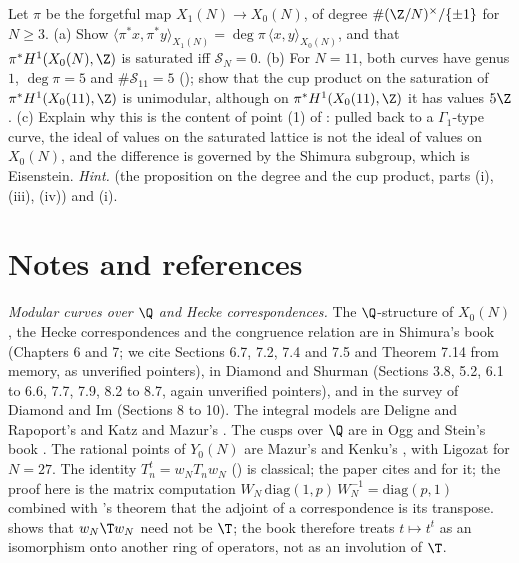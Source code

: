 \begin{exercise}[harder]\label{ex:moddeg:ex-shimura}
Let $\pi$ be the forgetful map $X_1(N)\to X_0(N)$, of degree $\#(\Z/N)^\times/\{\pm1\}$ for $N\ge3$. (a) Show $\langle\pi^*x,\pi^*y\rangle_{X_1(N)}=\deg\pi\,\langle x,y\rangle_{X_0(N)}$, and that
$\pi^*H^1(X_0(N),\Z)$ is saturated iff $\mathcal S_N=0$. (b) For $N=11$, both curves have genus $1$, $\deg\pi=5$ and $\#\mathcal S_{11}=5$ (); show that the cup product on the
saturation of $\pi^*H^1(X_0(11),\Z)$ is unimodular, although on $\pi^*H^1(X_0(11),\Z)$ it has values $5\Z$. (c) Explain why this is the content of point (1) of : pulled back to a
$\Gamma_1$-type curve, the ideal of values on the saturated lattice is not the ideal of values on $X_0(N)$, and the difference is governed by the Shimura subgroup, which is Eisenstein.
\emph{Hint.}  (the proposition on the degree and the cup product, parts (i), (iii), (iv)) and (i).
\end{exercise}

\section{Notes and references}\label{sec:moddeg:notes}

\emph{Modular curves over $\Q$ and Hecke correspondences.} The $\Q$-structure of $X_0(N)$, the Hecke correspondences and the congruence relation are in Shimura's book \cite{Shimura71} (Chapters 6
and 7; we cite Sections 6.7, 7.2, 7.4 and 7.5 and Theorem 7.14 from memory, as unverified pointers), in Diamond and Shurman \cite{DiamondShurman} (Sections 3.8, 5.2, 6.1 to 6.6, 7.7, 7.9, 8.2 to 8.7, again
unverified pointers), and in the survey of Diamond and Im \cite{DiamondIm} (Sections 8 to 10). The integral models are Deligne and Rapoport's \cite{DeligneRapoport73} and Katz and Mazur's \cite{KatzMazur85}. The
cusps over $\Q$ are in Ogg \cite{Ogg73} and Stein's book \cite{Stein}. The rational points of $Y_0(N)$ are Mazur's \cite{Mazur78} and Kenku's \cite{Kenku79,Kenku80a,Kenku80b,Kenku81}, with Ligozat
\cite{Ligozat75} for $N=27$. The identity $T_n^t=w_NT_nw_N$ () is classical; the paper cites \cite[\S\S1.6.1, 1.8.2]{DFG04} and \cite[\S4.4]{DDT} for it; the proof here is
the matrix computation $W_N\,\mathrm{diag}(1,p)\,W_N^{-1}=\mathrm{diag}(p,1)$ combined with 's theorem that the adjoint of a correspondence is its transpose.  shows that
$w_N\T w_N$ need not be $\T$; the book therefore treats $t\mapsto t^t$ as an isomorphism onto another ring of operators, not as an involution of $\T$.

